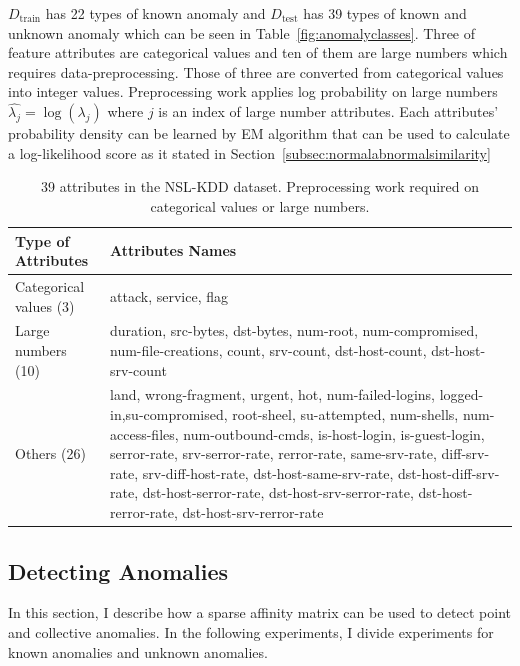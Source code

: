 $D_{\text{train}}$ has 22 types of known anomaly and $D_{\text{test}}$ has 39 types of known and unknown anomaly which can be seen in Table~\ref{fig:anomalyclasses}. 
Three of feature attributes are categorical values and ten of them are large numbers which requires data-preprocessing. 
Those of three are converted from categorical values into integer values. 
Preprocessing work applies log probability on large numbers $\hat{\lambda_{j}} = \log (\lambda_{j})$ where $j$ is an index of large number attributes. 
Each attributes' probability density can be learned by EM algorithm that can be used to calculate a log-likelihood score as it stated in Section~\ref{subsec:normalabnormalsimilarity}
\begin{table}[h]
\begin{center}
\begin{tabular}{| l | p{10cm} |}
\hline
Type of Attributes & Attributes Names \\
\hline
Categorical values (3) & attack, service, flag \\
\hline
Large numbers (10) & duration, src-bytes, dst-bytes, num-root, num-compromised, num-file-creations, count, srv-count, dst-host-count, dst-host-srv-count \\
\hline
Others (26) & land, wrong-fragment, urgent, hot, num-failed-logins, logged-in,su-compromised, root-sheel, su-attempted, num-shells, num-access-files, num-outbound-cmds, is-host-login, is-guest-login, serror-rate, srv-serror-rate, rerror-rate, same-srv-rate, diff-srv-rate, srv-diff-host-rate, dst-host-same-srv-rate, dst-host-diff-srv-rate, dst-host-serror-rate, dst-host-srv-serror-rate, dst-host-rerror-rate, dst-host-srv-rerror-rate \\
\hline
\end{tabular}
\end{center}
\caption{39 attributes in the NSL-KDD dataset. Preprocessing work required on categorical values or large numbers.}
\label{fig:preprocessing}
\end{table}

\subsection{Detecting Anomalies}
\label{subsec:detectinganomalies}
In this section, I describe how a sparse affinity matrix can be used to detect point and collective anomalies. 
In the following experiments, I divide experiments for known anomalies and unknown anomalies. 

\begin{table}[h]
\begin{center}
\end{center}
\caption{Sampled data}
\label{fig:refSingleRobot1}
\end{table}

